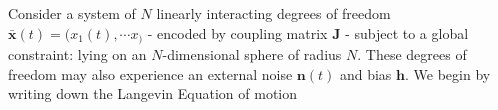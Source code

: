 Consider a system of $N$ linearly interacting degrees of freedom $\mathbf{\bar x}(t) = (x_1(t),\cdots x_)$ - encoded by coupling matrix $\mathbf{J}$ - subject to a global constraint: lying on an $N$-dimensional sphere of radius $N$. These degrees of freedom may also experience an external noise $\mathbf{n}(t)$ and bias $\mathbf{h}$. We begin by writing down the Langevin Equation of motion
